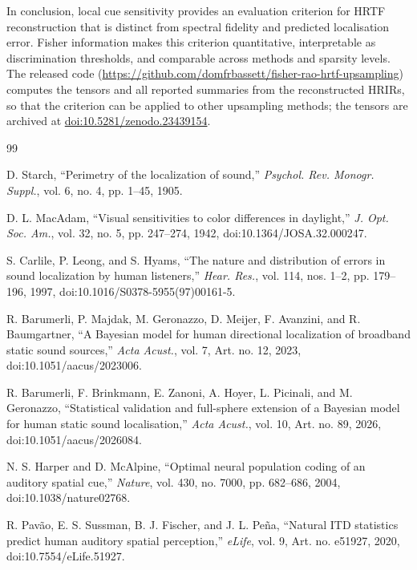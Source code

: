 \documentclass[journal]{IEEEtran}
\begin{document}
In conclusion, local cue sensitivity provides an evaluation criterion for HRTF reconstruction that is distinct from spectral fidelity and predicted localisation error. Fisher information makes this criterion quantitative, interpretable as discrimination thresholds, and comparable across methods and sparsity levels. The released code (\url{https://github.com/domfrbassett/fisher-rao-hrtf-upsampling}) computes the tensors and all reported summaries from the reconstructed HRIRs, so that the criterion can be applied to other upsampling methods; the tensors are archived at \href{https://doi.org/10.5281/zenodo.23439154}{doi:10.5281/zenodo.23439154}.

\FloatBarrier
\begingroup
\footnotesize
\setlength{\itemsep}{0pt}
\setlength{\parsep}{0pt}
\begin{thebibliography}{99}

D. Starch, ``Perimetry of the localization of sound,'' \textit{Psychol. Rev. Monogr. Suppl.}, vol. 6, no. 4, pp. 1--45, 1905.

D. L. MacAdam, ``Visual sensitivities to color differences in daylight,'' \textit{J. Opt. Soc. Am.}, vol. 32, no. 5, pp. 247--274, 1942, doi:10.1364/JOSA.32.000247.

S. Carlile, P. Leong, and S. Hyams, ``The nature and distribution of errors in sound localization by human listeners,'' \textit{Hear. Res.}, vol. 114, nos. 1--2, pp. 179--196, 1997, doi:10.1016/S0378-5955(97)00161-5.

R. Barumerli, P. Majdak, M. Geronazzo, D. Meijer, F. Avanzini, and R. Baumgartner, ``A Bayesian model for human directional localization of broadband static sound sources,'' \textit{Acta Acust.}, vol. 7, Art. no. 12, 2023, doi:10.1051/aacus/2023006.

R. Barumerli, F. Brinkmann, E. Zanoni, A. Hoyer, L. Picinali, and M. Geronazzo, ``Statistical validation and full-sphere extension of a Bayesian model for human static sound localisation,'' \textit{Acta Acust.}, vol. 10, Art. no. 89, 2026, doi:10.1051/aacus/2026084.

N. S. Harper and D. McAlpine, ``Optimal neural population coding of an auditory spatial cue,'' \textit{Nature}, vol. 430, no. 7000, pp. 682--686, 2004, doi:10.1038/nature02768.

R. Pav\~ao, E. S. Sussman, B. J. Fischer, and J. L. Pe\~na, ``Natural ITD statistics predict human auditory spatial perception,'' \textit{eLife}, vol. 9, Art. no. e51927, 2020, doi:10.7554/eLife.51927.


\end{thebibliography}
\end{document}
